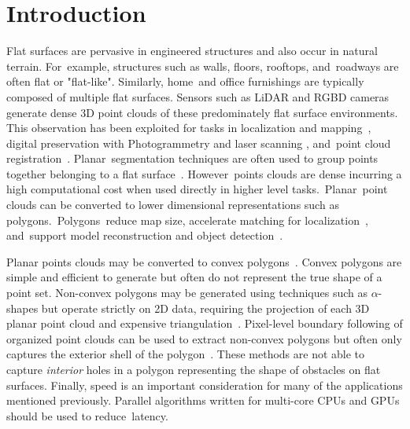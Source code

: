 \section{Introduction}
Flat surfaces are pervasive in engineered structures and also occur in natural terrain. For~example, structures such as walls, floors, rooftops, and~roadways are often flat or "flat-like". Similarly, home~and office furnishings are typically composed of multiple flat surfaces. Sensors such as LiDAR and RGBD cameras generate dense 3D point clouds of these predominately flat surface environments. This observation has been exploited for tasks in localization and mapping~\cite{pathak_online_2010}, digital preservation with Photogrammetry and laser scanning \cite{malihi_3d_2016, lerma_terrestrial_2010, balsa-barreiro_generation_2018}, and~point cloud registration~\cite{rusinkiewicz_efficient_2001}. Planar~segmentation techniques are often used to group points together belonging to a flat surface~\cite{feng_fast_2014, pham_geometrically_2016-1, schaefer_maximum_2019}. However~points clouds are dense incurring a high computational cost when used directly in higher level tasks.~Planar~point clouds can be converted to lower dimensional representations such as polygons.~Polygons~reduce map size, accelerate matching for localization~\cite{lee_indoor_2012-1}, and~support model reconstruction and object detection~\cite{cao_roof_2017}. 

Planar points clouds may be converted to convex polygons~\cite{biswas_planar_2012}. Convex polygons are simple and efficient to generate but often do not represent the true shape of a point set. Non-convex polygons may be generated using techniques such as $\alpha$-shapes but operate strictly on 2D data, requiring the projection of each 3D planar point cloud and expensive triangulation~\cite{lee_fast_2013, edelsbrunner_shape_1983}. Pixel-level boundary following of organized point clouds can be used to extract non-convex polygons but often only captures the exterior shell of the polygon~\cite{lee_indoor_2012-1}. These methods are not able to capture \emph{interior} holes in a polygon representing the shape of obstacles on flat surfaces. Finally, speed is an important consideration for many of the applications mentioned previously. Parallel algorithms written for multi-core CPUs and GPUs should be used to reduce~latency. 

